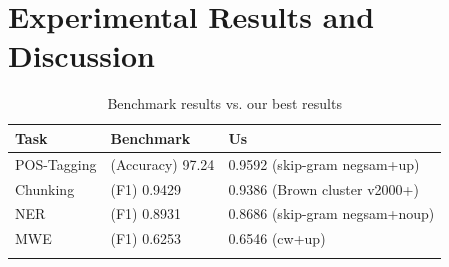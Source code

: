 \section{Experimental Results and Discussion}

\begin{table}
\caption{Benchmark results vs. our best results}
\begin{center}
\begin{small}
\begin{tabular}{lll}
\hline
\textbf{Task} & \textbf{Benchmark} & \textbf{Us} \\ \hline
POS-Tagging & (Accuracy) 97.24 \cite{Toutanova:2003} & 0.9592 (skip-gram negsam+up) \\ 
Chunking & (F1) 0.9429 \cite{Sha:2003} & 0.9386 (Brown cluster v2000+)\\  
NER & (F1) 0.8931 \cite{Ando:2005} & 0.8686 (skip-gram negsam+noup)\\  
MWE & (F1) 0.6253 \cite{Schneider+:2014} & 0.6546 (cw+up)\\ 
\hline
\label{benchmark}
\end{tabular}
\end{small}
\end{center}
\end{table}

